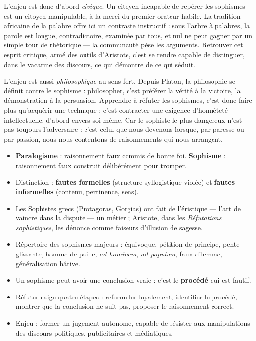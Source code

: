 \documentclass[11pt]{article}
\begin{document}
L'enjeu est donc d'abord \emph{civique}. Un citoyen incapable de repérer les sophismes est un citoyen manipulable, à la merci du premier orateur habile. La tradition africaine de la palabre offre ici un contraste instructif : sous l'arbre à palabres, la parole est longue, contradictoire, examinée par tous, et nul ne peut gagner par un simple tour de rhétorique — la communauté pèse les arguments. Retrouver cet esprit critique, armé des outils d'Aristote, c'est se rendre capable de distinguer, dans le vacarme des discours, ce qui démontre de ce qui séduit.

L'enjeu est aussi \emph{philosophique} au sens fort. Depuis Platon, la philosophie se définit contre le sophisme : philosopher, c'est préférer la vérité à la victoire, la démonstration à la persuasion. Apprendre à réfuter les sophismes, c'est donc faire plus qu'acquérir une technique : c'est contracter une exigence d'honnêteté intellectuelle, d'abord envers soi-même. Car le sophiste le plus dangereux n'est pas toujours l'adversaire : c'est celui que nous devenons lorsque, par paresse ou par passion, nous nous contentons de raisonnements qui nous arrangent.

\begin{aretenir}
\begin{itemize}
\item \textbf{Paralogisme} : raisonnement faux commis de bonne foi. \textbf{Sophisme} : raisonnement faux construit délibérément pour tromper.
\item Distinction : \textbf{fautes formelles} (structure syllogistique violée) et \textbf{fautes informelles} (contenu, pertinence, sens).
\item Les Sophistes grecs (Protagoras, Gorgias) ont fait de l'éristique — l'art de vaincre dans la dispute — un métier ; Aristote, dans les \emph{Réfutations sophistiques}, les dénonce comme faiseurs d'illusion de sagesse.
\item Répertoire des sophismes majeurs : équivoque, pétition de principe, pente glissante, homme de paille, \emph{ad hominem}, \emph{ad populum}, faux dilemme, généralisation hâtive.
\item Un sophisme peut avoir une conclusion vraie : c'est le \textbf{procédé} qui est fautif.
\item Réfuter exige quatre étapes : reformuler loyalement, identifier le procédé, montrer que la conclusion ne suit pas, proposer le raisonnement correct.
\item Enjeu : former un jugement autonome, capable de résister aux manipulations des discours politiques, publicitaires et médiatiques.
\end{itemize}
\end{aretenir}
\end{document}
